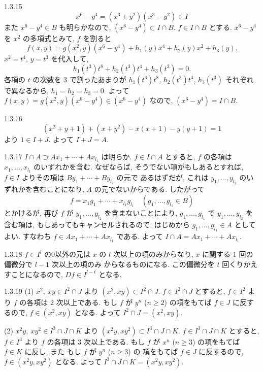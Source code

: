 \begin{ans}{1.3.15}
  \[
    x^6 - y^4 = (x^3 + y^2)(x^3 - y^2) \in I
  \]
  また $x^6 - y^4 \in B$ も明らかなので, $(x^6 - y^4) \subset I \cap B$.
  $f \in I \cap B$ とする.
  $x^6 - y^4$ を $x^2$ の多項式とみて, $f$ を割ると
  \[
    f(x,y) = g(x^2, y)(x^6 - y^4) + h_1(y)x^4 + h_2(y)x^2 + h_3(y).
  \]
  $x^2 = t^4$, $y = t^3$ を代入して,
  \[
    h_1(t^3)t^8 + h_2(t^3)t^4 + h_3(t^3) = 0.
  \]
  各項の $t$ の次数を $3$ で割ったあまりが $h_1(t^3)t^8$, $h_2(t^3)t^4$, $h_3(t^3)$ それぞれで異なるから,
  $h_1 = h_2 = h_3 = 0$.
  よって $f(x,y) = g(x^2, y)(x^6 - y^4) \in (x^6 - y^4)$ なので, $(x^6 - y^4) = I \cap B$.
\end{ans}

\begin{ans}{1.3.16}
  \[
    (x^2 + y + 1) + (x + y^2) - x(x + 1) - y(y + 1) = 1
  \]
  より $1 \in I + J$. よって $I + J = A$.
\end{ans}

\begin{ans}{1.3.17}
  $I \cap A \supset Ax_1 + \cdots + Ax_{l_1}$ は明らか.
  $f \in I \cap A$ とすると, $f$ の各項は $x_1, \ldots, x_{l_1}$ のいずれかを含む.
  なぜならば, そうでない項がもしあるとすれば, $f \in I$ よりその項は $By_1 + \cdots + By_{l_2}$ の元で
  あるはずだが, これは $y_1, \ldots, y_{l_2}$ のいずれかを含むことになり, $A$ の元でないからである.
  したがって
  \[
    f = x_1 g_1 + \cdots + x_{l_1} g_{l_1} \quad (g_1, \ldots, g_{l_1} \in B)
  \]
  とかけるが, 再び $f$ が $y_1, \ldots, y_{l_2}$ を含まないことにより, $g_1, \ldots, g_{l_1}$ で
  $y_1, \ldots, y_{l_2}$ を含む項は, もしあってもキャンセルされるので, はじめから
  $g_1, \ldots, g_{l_1} \in A$ としてよい. すなわち $f \in Ax_1 + \cdots + Ax_{l_1}$ である.
  よって $I \cap A = Ax_1 + \cdots + Ax_{l_1}$.
\end{ans}

\begin{ans}{1.3.18}
  $f \in I^l$ の$0$以外の元は $x$ の $l$ 次以上の項のみからなり, $x$ に関する $1$ 回の偏微分で $l-1$ 次以上の項のみ
  からなるものになる. この偏微分を $t$ 回くりかえすことになるので, $Df \in I^{l-t}$ となる.
\end{ans}

\begin{ans}{1.3.19}
  (1) $x^2,\ xy \in I^2 \cap J$ より $(x^2, xy) \subset I^2 \cap J$.
  $f \in I^2 \cap J$ とすると, $f \in I^2$ より $f$ の各項は $2$ 次以上である.
  もし $f$ が $y^n$ ($n \geq 2$) の項をもてば $f \in J$ に反するので, $f \in (x^2, xy)$ となる.
  よって $I^2 \cap J = (x^2, xy)$.

  \medskip
  (2) $x^2 y,\ xy^2 \in I^3 \cap J \cap K$ より $(x^2 y, xy^2) \subset I^3 \cap J \cap K$.
  $f \in I^3 \cap J \cap K$ とすると, $f \in I^3$ より $f$ の各項は $3$ 次以上である.
  もし $f$ が $x^n$ ($n \geq 3$) の項をもてば $f \in K$ に反し, また もし $f$ が $y^n$ ($n \geq 3$) の
  項をもてば $f \in J$ に反するので, $f \in (x^2 y, xy^2)$ となる.
  よって $I^3 \cap J \cap K = (x^2 y, xy^2)$.
\end{ans}
